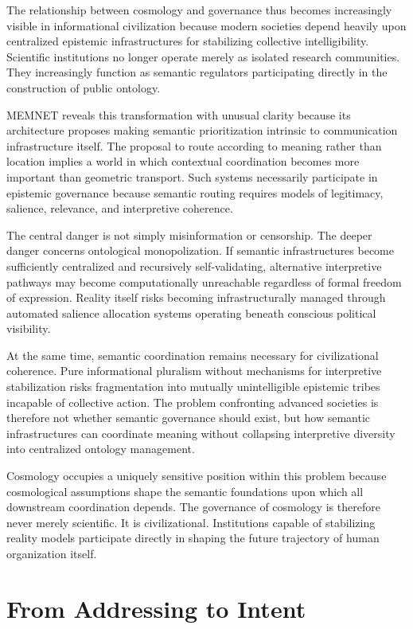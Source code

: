 \documentclass[11pt,a4paper]{article}
\begin{document}
The relationship between cosmology and governance thus becomes increasingly visible in informational civilization because modern societies depend heavily upon centralized epistemic infrastructures for stabilizing collective intelligibility. Scientific institutions no longer operate merely as isolated research communities. They increasingly function as semantic regulators participating directly in the construction of public ontology.

MEMNET reveals this transformation with unusual clarity because its architecture proposes making semantic prioritization intrinsic to communication infrastructure itself. The proposal to route according to meaning rather than location implies a world in which contextual coordination becomes more important than geometric transport. Such systems necessarily participate in epistemic governance because semantic routing requires models of legitimacy, salience, relevance, and interpretive coherence.

The central danger is not simply misinformation or censorship. The deeper danger concerns ontological monopolization. If semantic infrastructures become sufficiently centralized and recursively self-validating, alternative interpretive pathways may become computationally unreachable regardless of formal freedom of expression. Reality itself risks becoming infrastructurally managed through automated salience allocation systems operating beneath conscious political visibility.

At the same time, semantic coordination remains necessary for civilizational coherence. Pure informational pluralism without mechanisms for interpretive stabilization risks fragmentation into mutually unintelligible epistemic tribes incapable of collective action. The problem confronting advanced societies is therefore not whether semantic governance should exist, but how semantic infrastructures can coordinate meaning without collapsing interpretive diversity into centralized ontology management.

Cosmology occupies a uniquely sensitive position within this problem because cosmological assumptions shape the semantic foundations upon which all downstream coordination depends. The governance of cosmology is therefore never merely scientific. It is civilizational. Institutions capable of stabilizing reality models participate directly in shaping the future trajectory of human organization itself.

\section{From Addressing to Intent}
\end{document}
